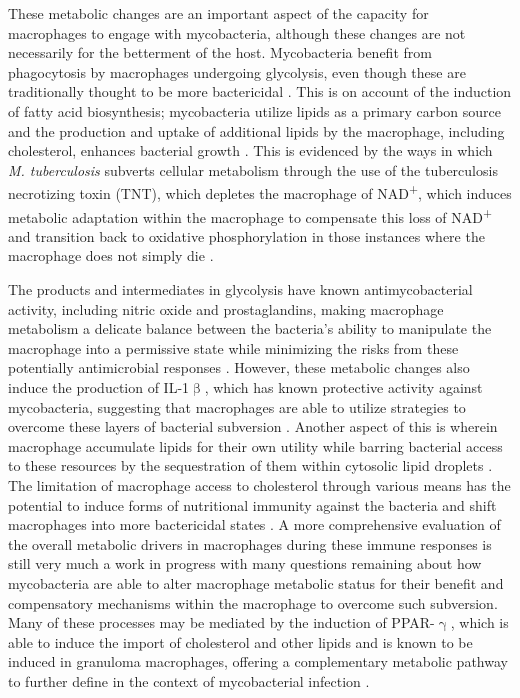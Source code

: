 These metabolic changes are an important aspect of the capacity for macrophages to engage with mycobacteria, although these changes are not necessarily for the betterment of the host. Mycobacteria benefit from phagocytosis by macrophages undergoing glycolysis, even though these are traditionally thought to be more bactericidal \citep{Escoll2019, Mehrotra2014, Shi2019}. This is on account of the induction of fatty acid biosynthesis; mycobacteria utilize lipids as a primary carbon source and the production and uptake of additional lipids by the macrophage, including cholesterol, enhances bacterial growth \citep{Gatfield2000, Nazarova2019, Yan2020}. This is evidenced by the ways in which \textit{M. tuberculosis} subverts cellular metabolism through the use of the tuberculosis necrotizing toxin (TNT), which depletes the macrophage of NAD\textsuperscript{+}, which induces metabolic adaptation within the macrophage to compensate this loss of NAD\textsuperscript{+} and transition back to oxidative phosphorylation in those instances where the macrophage does not simply die \citep{Howard2020}. 

The products and intermediates in glycolysis have known antimycobacterial activity, including nitric oxide and prostaglandins, making macrophage metabolism a delicate balance between the bacteria's ability to manipulate the macrophage into a permissive state while minimizing the risks from these potentially antimicrobial responses \citep{OsadaOka2019}. However, these metabolic changes also induce the production of IL-1$\upbeta$, which has known protective activity against mycobacteria, suggesting that macrophages are able to utilize strategies to overcome these layers of bacterial subversion \citep{Corcoran2016, Ogryzko2019, Fremond2007, Shi2019}. Another aspect of this is wherein macrophage accumulate lipids for their own utility while barring bacterial access to these resources by the sequestration of them within cytosolic lipid droplets \citep{Laval2021, Knight2018}. The limitation of macrophage access to cholesterol through various means has the potential to induce forms of nutritional immunity against the bacteria and shift macrophages into more bactericidal states \citep{Babunovic2022, Pandey2008, Yang2014c}. A more comprehensive evaluation of the overall metabolic drivers in macrophages during these immune responses is still very much a work in progress with many questions remaining about how mycobacteria are able to alter macrophage metabolic status for their benefit and compensatory mechanisms within the macrophage to overcome such subversion. Many of these processes may be mediated by the induction of PPAR-$\upgamma$, which is able to induce the import of cholesterol and other lipids and is known to be induced in granuloma macrophages, offering a complementary metabolic pathway to further define in the context of mycobacterial infection \citep{Chawla2001}.

